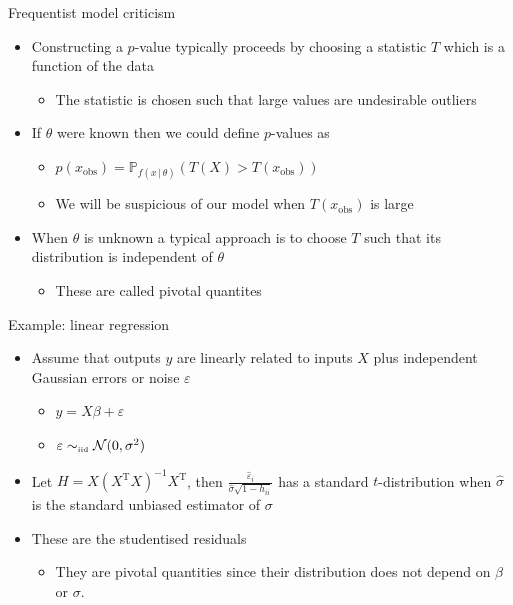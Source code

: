 \begin{frame}{Frequentist model criticism}
  \begin{itemize}
    \item Constructing a $p$-value typically proceeds by choosing a statistic $T$ which is a function of the data
    \begin{itemize}
      \item The statistic is chosen such that large values are undesirable \eg outliers
    \end{itemize}
    \vspace{\baselineskip}
    \pause
    \item If $\theta$ were known then we could define $p$-values as
    \begin{itemize}
      \item $p(x_{\textrm{obs}}) = \mathbb{P}_{f(x\,|\,\theta)}(T(X) > T(x_{\textrm{obs}}))$
      \item \ie We will be suspicious of our model when $T(x_{\textrm{obs}})$ is large
    \end{itemize}
    \vspace{\baselineskip}
    \pause
    \item When $\theta$ is unknown a typical approach is to choose $T$ such that its distribution is independent of $\theta$
    \begin{itemize}
      \item These are called pivotal quantites
    \end{itemize}
  \end{itemize}
\end{frame}

\begin{frame}{Example: linear regression}
  \begin{itemize}
    \item Assume that outputs $y$ are linearly related to inputs $X$ plus independent Gaussian errors or noise $\varepsilon$
    \begin{itemize}
      \item $y = X\beta + \varepsilon$
      \item $\varepsilon \sim_{\mbox{\tiny iid}} \mathcal{N}(0, \sigma^2)$
    \end{itemize}
    \pause
    \vspace{\baselineskip}
    \item Let $H = X(X^{\textrm{T}}X)^{-1}X^{\textrm{T}}$, then $\frac{\hat\varepsilon_i}{\hat\sigma\sqrt{1 - h_{ii}}}$ has a standard $t$-distribution when $\hat\sigma$ is the standard unbiased estimator of $\sigma$
    \pause
    \vspace{\baselineskip}
    \item These are the studentised residuals
    \begin{itemize}
      \item They are pivotal quantities since their distribution does not depend on $\beta$ or $\sigma$.
    \end{itemize}
  \end{itemize}
\end{frame}

